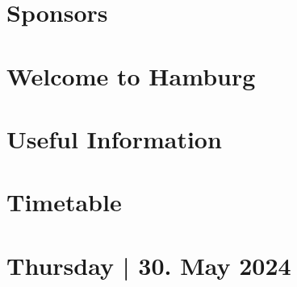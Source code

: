 \documentclass[openany, parskip=full, 12pt, a4]{scrbook}
\begin{document}

	
	
% 


\chapter{Sponsors}



\chapter{Welcome to Hamburg}
% 


\tableofcontents


\chapter{Useful Information}
% 


\chapter{Timetable}
% 





\chapter{Thursday | 30. May 2024}

\end{document}
